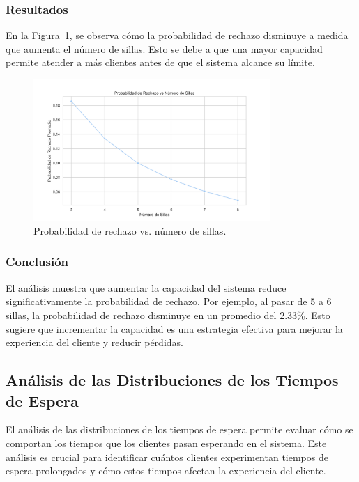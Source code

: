 \documentclass{article}
\begin{document}
\subsubsection{Resultados}

En la Figura~\ref{fig:sensibilidad}, se observa cómo la probabilidad de rechazo disminuye a 
medida que aumenta el número de sillas. Esto se debe a que una mayor capacidad permite 
atender a más clientes antes de que el sistema alcance su límite.

\begin{figure}[H]
    \centering
    \includegraphics[width=0.8\textwidth]{../images/sensibilidad.png}
    \caption{Probabilidad de rechazo vs. número de sillas.}
    \label{fig:sensibilidad}
\end{figure}

\subsubsection{Conclusión}

El análisis muestra que aumentar la capacidad del sistema reduce significativamente la 
probabilidad de rechazo. Por ejemplo, al pasar de 5 a 6 sillas, la probabilidad de 
rechazo disminuye en un promedio del 2.33\%. 
Esto sugiere que incrementar la capacidad es una estrategia efectiva para mejorar la 
experiencia del cliente y reducir pérdidas.

\subsection{Análisis de las Distribuciones de los Tiempos de Espera}

El análisis de las distribuciones de los tiempos de espera permite evaluar cómo se comportan 
los tiempos que los clientes pasan esperando en el sistema. Este análisis es crucial para 
identificar cuántos clientes experimentan tiempos de espera prolongados y cómo estos 
tiempos afectan la experiencia del cliente.
\end{document}
